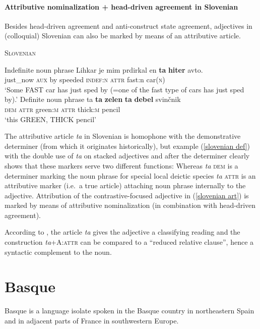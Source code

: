 \paragraph{Attributive nominalization + head-driven agreement in Slovenian}
Besides head-driven agreement and anti-construct state agreement, adjectives in (colloquial) Slovenian can also be marked by means of an attributive article.
\begin{exe}
\ex \textsc{Slovenian} \citep{marusic-etal2007} \label{slovenian art}
\begin{xlist}
\ex Indefinite noun phrase
\gll	Lihkar je mim prdirkal en \textbf{ta} \textbf{hiter} avto.\\
	just\_now \textsc{aux} by speeded \textsc{indef:n} \textsc{attr} fast:n car(\textsc{n})\\
\glt	‘Some FAST car has just sped by (=one of the fast type of cars has just sped by).’ 
\ex Definite noun phrase \label{slovenian def}
\gll 	ta \textbf{ta} \textbf{zelen} \textbf{ta} \textbf{debel} svin\v{c}nik\\
	\textsc{dem} \textsc{attr} green\textsc{:m} \textsc{attr} thick\textsc{:m} pencil\\
\glt 	‘this GREEN, THICK pencil’
\end{xlist}
\end{exe}
The attributive article \textit{ta} in Slovenian is homophone with the demonstrative determiner (from which it originates historically), but example (\ref{slovenian def}) with the double use of \textit{ta} on stacked adjectives and after the determiner clearly shows that these markers serve two different functions: Whereas \textit{ta} \textsc{dem} is a determiner marking the noun phrase for special local deictic species \textit{ta} \textsc{attr} is an attributive marker (i.e.~a true article) attaching noun phrase internally to the adjective. Attribution of the contrastive-focused adjective in (\ref{slovenian art}) is marked by means of attributive nominalization (in combination with head-driven agreement).

According to \cite{marusic-etal2007}, the article \textit{ta} gives the adjective a classifying reading and the construction \textit{ta}+A:\textsc{attr} can be compared to a “reduced relative clause”, hence a syntactic complement to the noun.

\section{Basque}
Basque is a language isolate spoken in the Basque country in northeastern Spain and in adjacent parts of France in southwestern Europe. 

